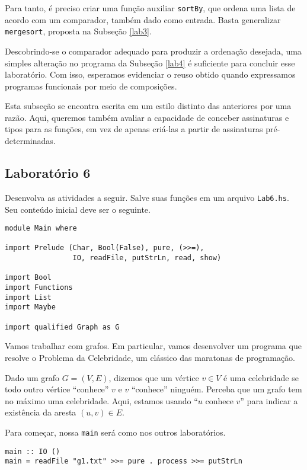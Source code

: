 \documentclass[a4paper]{article}
\begin{document}
Para tanto, é preciso criar uma função auxiliar \texttt{sortBy}, que ordena uma lista de acordo com um comparador, também dado como entrada.
Basta generalizar \texttt{mergesort}, proposta na Subseção \ref{lab3}.

Descobrindo-se o comparador adequado para produzir a ordenação desejada, uma simples alteração no programa da Subseção \ref{lab4} é suficiente para concluir esse laboratório.
Com isso, esperamos evidenciar o reuso obtido quando expressamos programas funcionais por meio de composições.

Esta subseção se encontra escrita em um estilo distinto das anteriores por uma razão.
Aqui, queremos também avaliar a capacidade de conceber assinaturas e tipos para as funções, em vez de apenas criá-las a partir de assinaturas pré-determinadas.

\subsection{Laboratório 6}

Desenvolva as atividades a seguir.
Salve suas funções em um arquivo \texttt{Lab6.hs}.
Seu conteúdo inicial deve ser o seguinte.

\begin{verbatim}
module Main where

import Prelude (Char, Bool(False), pure, (>>=),
                IO, readFile, putStrLn, read, show)

import Bool
import Functions
import List
import Maybe

import qualified Graph as G
\end{verbatim}

Vamos trabalhar com grafos.
Em particular, vamos desenvolver um programa que resolve o Problema da Celebridade, um clássico das maratonas de programação.

Dado um grafo $G = (V, E)$, dizemos que um vértice $v \in V$ é uma celebridade se todo outro vértice ``conhece'' $v$ e $v$ ``conhece'' ninguém.
Perceba que um grafo tem no máximo uma celebridade.
Aqui, estamos usando ``$u$ conhece $v$'' para indicar a existência da aresta $(u, v) \in E$.

Para começar, nossa \texttt{main} será como nos outros laboratórios.

\begin{verbatim}
main :: IO ()
main = readFile "g1.txt" >>= pure . process >>= putStrLn
\end{verbatim}
\end{document}
